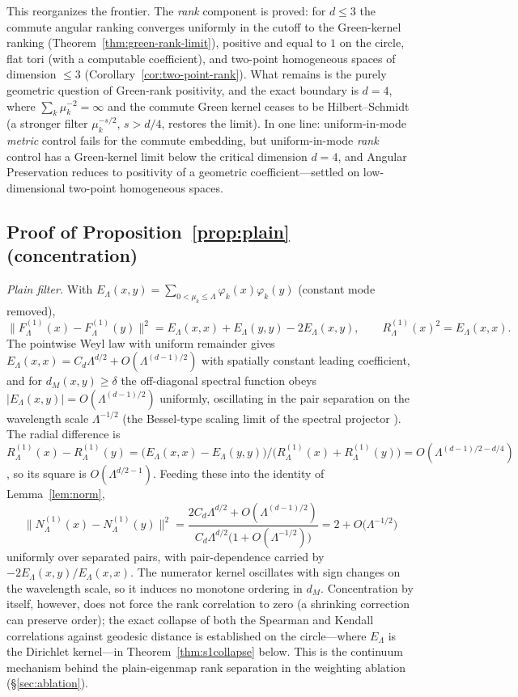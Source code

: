 \documentclass[review,supplement]{siamart220329}
\begin{document}
\noindent This reorganizes the frontier. The \emph{rank} component is proved: for
$d\le3$ the commute angular ranking converges uniformly in the cutoff to the Green-kernel
ranking (Theorem~\ref{thm:green-rank-limit}), positive and equal to $1$ on the circle,
flat tori (with a computable coefficient), and two-point homogeneous spaces of dimension
$\le3$ (Corollary~\ref{cor:two-point-rank}). What remains is the purely geometric
question of Green-rank positivity, and the exact boundary is $d=4$, where
$\sum_k\mu_k^{-2}=\infty$ and the commute Green kernel ceases to be Hilbert--Schmidt (a
stronger filter $\mu_k^{-s/2}$, $s>d/4$, restores the limit). In one line: uniform-in-mode
\emph{metric} control fails for the commute embedding, but uniform-in-mode \emph{rank}
control has a Green-kernel limit below the critical dimension $d=4$, and Angular
Preservation reduces to positivity of a geometric coefficient---settled on
low-dimensional two-point homogeneous spaces.


\subsection*{Proof of Proposition~\ref{prop:plain} (concentration)}
\emph{Plain filter.} With $E_\Lambda(x,y)=\sum_{0<\mu_k\le\Lambda}
\varphi_k(x)\varphi_k(y)$ (constant mode removed),
\[
\big\lVert F^{(1)}_\Lambda(x)-F^{(1)}_\Lambda(y)\big\rVert^2
=E_\Lambda(x,x)+E_\Lambda(y,y)-2E_\Lambda(x,y),
\qquad R^{(1)}_\Lambda(x)^2=E_\Lambda(x,x).
\]
The pointwise Weyl law with uniform remainder \cite{hormander1968} gives
$E_\Lambda(x,x)=C_d\Lambda^{d/2}+O(\Lambda^{(d-1)/2})$ with spatially constant
leading coefficient, and for $d_M(x,y)\ge\delta$ the off-diagonal spectral
function obeys $\lvert E_\Lambda(x,y)\rvert=O(\Lambda^{(d-1)/2})$ uniformly,
oscillating in the pair separation on the wavelength scale $\Lambda^{-1/2}$
(the Bessel-type scaling limit of the spectral projector
\cite{canzanihanin2015}). The radial difference is
$R^{(1)}_\Lambda(x)-R^{(1)}_\Lambda(y)
=\big(E_\Lambda(x,x)-E_\Lambda(y,y)\big)/\big(R^{(1)}_\Lambda(x)+R^{(1)}_\Lambda(y)\big)
=O(\Lambda^{(d-1)/2-d/4})$, so its square is $O(\Lambda^{d/2-1})$. Feeding
these into the identity of Lemma~\ref{lem:norm},
\[
\big\lVert N^{(1)}_\Lambda(x)-N^{(1)}_\Lambda(y)\big\rVert^2
=\frac{2C_d\Lambda^{d/2}+O(\Lambda^{(d-1)/2})}
{C_d\Lambda^{d/2}\big(1+O(\Lambda^{-1/2})\big)}
=2+O\big(\Lambda^{-1/2}\big)
\]
uniformly over separated pairs, with pair-dependence carried by
$-2E_\Lambda(x,y)/E_\Lambda(x,x)$. The numerator kernel oscillates with sign
changes on the wavelength scale, so it induces no monotone ordering in $d_M$.
Concentration by itself, however, does not force the rank correlation to zero
(a shrinking correction can preserve order); the exact collapse of both the
Spearman and Kendall correlations against geodesic distance is established on the
circle---where $E_\Lambda$ is the Dirichlet kernel---in
Theorem~\ref{thm:s1collapse} below. This is the continuum mechanism behind the
plain-eigenmap rank separation in the weighting ablation (\S\ref{sec:ablation}).
\end{document}
